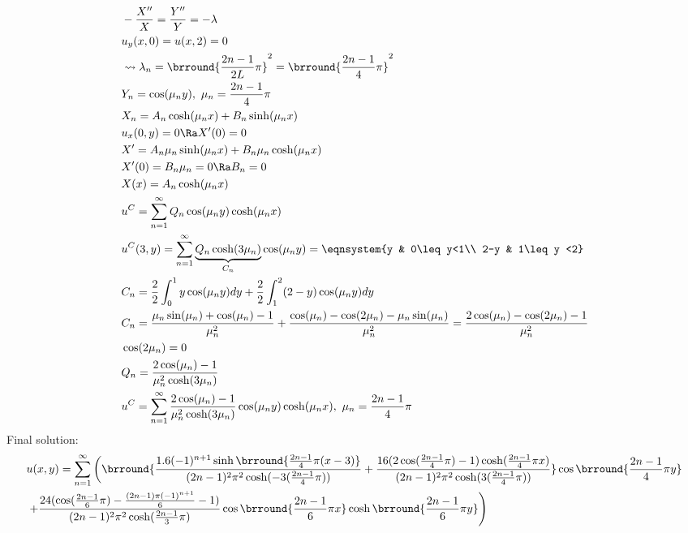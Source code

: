 \begin{align*}
    &-\frac{X''}{X}=\frac{Y''}{Y}=-\lambda\\
    &u_y(x,0)=u(x,2)=0\\
    &\leadsto \lambda_n=\brround{\frac{2n-1}{2L}\pi}^2=\brround{\frac{2n-1}{4}\pi}^2\\
    &Y_n=\cos(\mu_n y),\ \mu_n=\frac{2n-1}{4}\pi\\
    &X_n=A_n\cosh(\mu_nx)+B_n\sinh(\mu_nx)\\
    &u_x(0,y)=0\Ra X'(0)=0\\
    &X'=A_n\mu_n\sinh(\mu_nx)+B_n\mu_n\cosh(\mu_nx)\\
    &X'(0)=B_n\mu_n=0\Ra B_n=0\\
    &X(x)=A_n\cosh(\mu_nx)\\
    &u^C=\sum_{n=1}^\infty Q_n\cos(\mu_n y)\cosh(\mu_n x)\\
    &u^C(3,y)=\sum_{n=1}^\infty \underbrace{Q_n\cosh(3\mu_n)}_{C_n}\cos(\mu_ny)=\eqnsystem{y & 0\leq y<1\\ 2-y & 1\leq y <2}\\
    &C_n=\frac{2}{2}\int_0^1y\cos(\mu_ny)dy+\frac{2}{2}\int_1^2(2-y)\cos(\mu_ny)dy\\
    &C_n=\frac{\mu_n\sin(\mu_n)+\cos(\mu_n)-1}{\mu_n^2}+\frac{\cos(\mu_n)-\cos(2\mu_n)-\mu_n\sin(\mu_n)}{\mu_n^2}=\frac{2\cos(\mu_n)-\cos(2\mu_n)-1}{\mu_n^2}\\
    &\cos(2\mu_n)=0\\
    &Q_n=\frac{2\cos(\mu_n)-1}{\mu_n^2\cosh(3\mu_n)}\\
    &u^C=\sum_{n=1}^\infty\frac{2\cos(\mu_n)-1}{\mu_n^2\cosh(3\mu_n)}\cos(\mu_ny)\cosh(\mu_nx),\ \mu_n=\frac{2n-1}{4}\pi
\end{align*}
Final solution:
\begin{align*}
    &u(x,y)=\sum_{n=1}^\infty\left(\brround{\frac{1.6(-1)^{n+1}\sinh\brround{\frac{2n-1}{4}\pi(x-3)}}{(2n-1)^2\pi^2\cosh(-3(\frac{2n-1}{4}\pi))}+\frac{16(2\cos(\frac{2n-1}{4}\pi)-1)\cosh(\frac{2n-1}{4}\pi x)}{(2n-1)^2\pi^2\cosh(3(\frac{2n-1}{4}\pi))}}\cos\brround{\frac{2n-1}{4}\pi y}\right.\\
    &\left.+\frac{24(\cos(\frac{2n-1}{6}\pi)-\frac{(2n-1)\pi(-1)^{n+1}}{6}-1)}{(2n-1)^2\pi^2\cosh(\frac{2n-1}{3}\pi)}\cos\brround{\frac{2n-1}{6}\pi x}\cosh\brround{\frac{2n-1}{6}\pi y}\right)
\end{align*}

